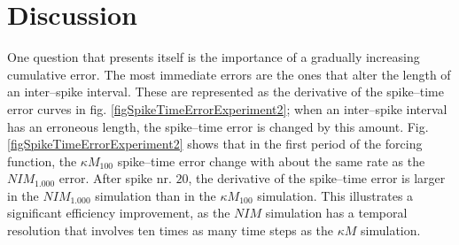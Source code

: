 \section{Discussion}  
	One question that presents itself is the importance of a gradually increasing cumulative error.
	The most immediate errors are the ones that alter the length of an inter--spike interval.
	These are represented as the derivative of the spike--time error curves in fig. \ref{figSpikeTimeErrorExperiment2}; %
		when an inter--spike interval has an erroneous length, the spike--time error is changed by this amount.
	Fig. \ref{figSpikeTimeErrorExperiment2} shows that in the first period of the forcing function, the $\kappa M_{100}$ spike--time error change with about the same rate as the $NIM_{1.000}$ error.
	After spike nr. $20$, the derivative of the spike--time error is larger in the $NIM_{1.000}$ simulation than in the $\kappa M_{100}$ simulation.
	This illustrates a significant efficiency improvement, as the $NIM$ simulation has a temporal resolution that involves ten times as many time steps as the $\kappa M$ simulation.

